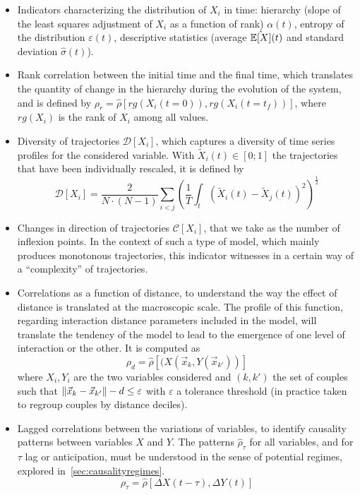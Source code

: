 \begin{itemize}
	\item Indicators characterizing the distribution of $X_i$ in time: hierarchy (slope of the least squares adjustment of $X_i$ as a function of rank) $\alpha (t)$, entropy of the distribution $\varepsilon (t)$, descriptive statistics (average $\hat{\operatorname{\mathbb{E}}\!\left[X\right]} (t)$ and standard deviation $\hat{\sigma} (t)$).
	\item Rank correlation between the initial time and the final time, which translates the quantity of change in the hierarchy during the evolution of the system, and is defined by $\rho_r = \hat{\rho}\left[rg(X_i(t=0)),rg(X_i(t=t_f))\right]$, where $rg(X_i)$ is the rank of $X_i$ among all values.
	\item Diversity of trajectories $\mathcal{D}\left[X_i\right]$, which captures a diversity of time series profiles for the considered variable. With $\tilde{X}_i(t)\in \left[0;1\right]$ the trajectories that have been individually rescaled, it is defined by
\[
\mathcal{D}\left[X_i\right] = \frac{2}{N\cdot(N-1)}\sum_{i<j} \left(\frac{1}{T}\int_{t} \left(\tilde{X}_i(t) - \tilde{X}_j(t)\right)^2 \right)^{\frac{1}{2}}
\]
	\item Changes in direction of trajectories $\mathcal{C}\left[X_i\right]$, that we take as the number of inflexion points. In the context of such a type of model, which mainly produces monotonous trajectories, this indicator witnesses in a certain way of a ``complexity'' of trajectories.
	\item Correlations as a function of distance, to understand the way the effect of distance is translated at the macroscopic scale. The profile of this function, regarding interaction distance parameters included in the model, will translate the tendency of the model to lead to the emergence of one level of interaction or the other. It is computed as
\[
\rho_d = \hat{\rho}\left[(X(\vec{x}_k,Y(\vec{x}_{k'}))\right]
\]
where $X_i, Y_i$ are the two variables considered and $(k,k')$ the set of couples such that $\left\lVert \vec{x}_k-\vec{x}_{k'} \right\rVert - d \leq \varepsilon$ with $\varepsilon$ a tolerance threshold (in practice taken to regroup couples by distance deciles).
	\item Lagged correlations between the variations of variables, to identify causality patterns between variables $X$ and $Y$. The patterns $\hat{\rho}_{\tau}$ for all variables, and for $\tau$ lag or anticipation, must be understood in the sense of potential regimes, explored in~\ref{sec:causalityregimes}.
\[
\rho_{\tau} = \hat{\rho}\left[\Delta X(t-\tau),\Delta Y(t)\right]
\]
\end{itemize}


